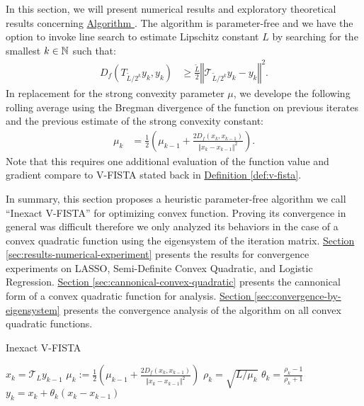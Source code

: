 \documentclass[12pt]{article}
\begin{document}
    In this section, we will present numerical results and exploratory theoretical results concerning \hyperref[alg:inexact-vfista]{Algorithm }. 
    The algorithm is parameter-free and we have the option to invoke line search to estimate Lipschitz constant $L$ by searching for the smallest $k \in \mathbb N$ such that: 
    \begin{align*}
        D_f\left(T_{\tilde L/2^k}y_k, y_k\right)
        &\ge 
        \frac{\tilde L}{2}
        \left\Vert 
            \mathcal T_{\widetilde{L}/2^k}y_k - y_k
        \right\Vert^2. 
    \end{align*}
    In replacement for the strong convexity parameter $\mu$, we develope the following rolling average using the Bregman divergence of the function on previous iterates and the previous estimate of the strong convexity constant: 
    \begin{align*}
        \mu_k &= 
        \frac{1}{2}
        \left(
            \mu_{k - 1} + 
            \frac{2D_f(x_k, x_{k - 1})}{\Vert x_k - x_{k -1}\Vert^2}
        \right). 
    \end{align*}
    Note that this requires one additional evaluation of the function value and gradient compare to V-FISTA stated back in 
    \hyperref[def:v-fista]{Definition \ref*{def:v-fista}}. 

    In summary, this section proposes a heuristic parameter-free algorithm we call ``Inexact V-FISTA'' for optimizing convex function. 
    Proving its convergence in general was difficult therefore we only analyzed its behaviors in the case of a convex quadratic function using the eigensystem of the iteration matrix.  
    \hyperref[sec:results-numerical-experiment]{Section \ref*{sec:results-numerical-experiment}} 
    presents the results for convergence experiments on LASSO, Semi-Definite Convex Quadratic, and Logistic Regression. 
    \hyperref[sec:cannonical-convex-quadratic]{Section \ref*{sec:cannonical-convex-quadratic}}
    presents the cannonical form of a convex quadratic function for analysis. 
    \hyperref[sec:convergence-by-eigensystem]{Section \ref*{sec:convergence-by-eigensystem}}
    presents the convergence analysis of the algorithm on all convex quadratic functions. 
    \begin{algorithm}
        \caption{Inexact V-FISTA}\label{alg:inexact-vfista}
        \begin{algorithmic}[1]
                    \State $x_k = \mathcal{T}_L y_{k - 1}$
                    \State $\mu_k := \frac{1}{2}
                        \left(\mu_{k - 1} + \frac{2D_f(x_k, x_{k - 1})}{\Vert x_k - x_{k - 1}\Vert^2}\right)$
                    \State $\rho_k = \sqrt{L/\mu_k}$
                    \State $\theta_k = \frac{\rho_k - 1}{\rho_k + 1}$
                    \State $y_k = x_k + \theta_k(x_k - x_{k - 1})$
                \EndFor
            \EndProcedure
        \end{algorithmic}
    \end{algorithm}
    
\end{document}
